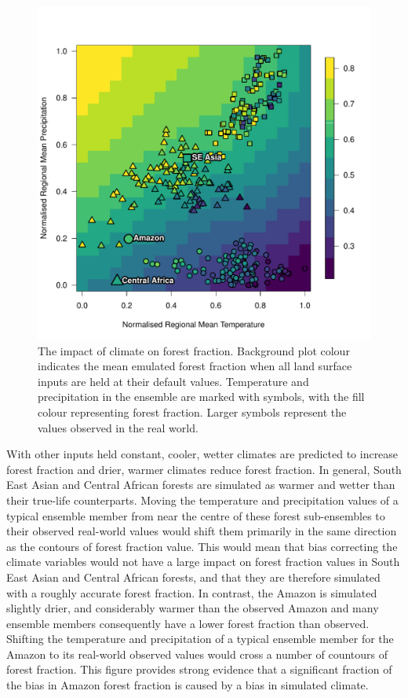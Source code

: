 \documentclass[gmd, manuscript]{copernicus}
\begin{document}
\begin{figure}[t]
\includegraphics[width=12cm]{../graphics/taat_temp_precip_quilt.pdf}
\caption{The impact of climate on forest fraction. Background plot colour indicates the mean emulated forest fraction when all land surface inputs are held at their default values. Temperature and precipitation in the ensemble are marked with symbols, with the fill colour representing forest fraction. Larger symbols represent the values observed in the real world.
}
\label{fig:taat_temp_precip_quilt}
\end{figure}

With other inputs held constant, cooler, wetter climates are predicted to increase forest fraction and drier, warmer climates reduce forest fraction. In general, South East Asian and Central African forests are simulated as warmer and wetter than their true-life counterparts. Moving the temperature and precipitation values of a typical ensemble member from near the centre of these forest sub-ensembles to their observed real-world values would shift them primarily in the same direction as the contours of forest fraction value. This would mean that bias correcting the climate variables would not have a large impact on forest fraction values in South East Asian and Central African forests, and that they are therefore simulated with a roughly accurate forest fraction. In contrast, the Amazon is simulated slightly drier, and considerably warmer than the observed Amazon and many ensemble members consequently have a lower forest fraction than observed. Shifting the temperature and precipitation of a typical ensemble member for the Amazon to its real-world observed values would cross a number of countours of forest fraction.  This figure provides strong evidence that a significant fraction of the bias in Amazon forest fraction is caused by a bias in simulated climate.
\end{document}
